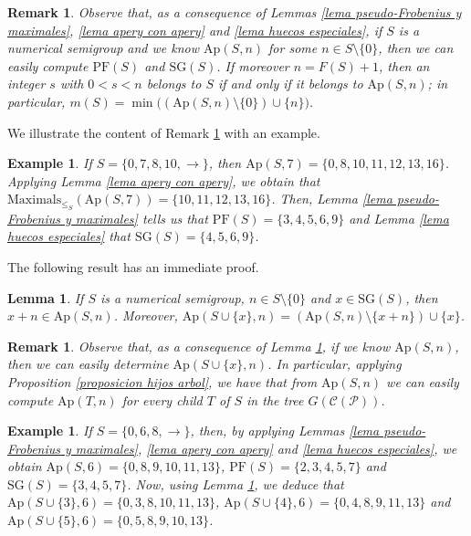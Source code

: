 \documentclass[11pt]{article}
\newtheorem{lemma}[theorem]{Lemma}
\newtheorem{remark}[theorem]{Remark}
\newtheorem{example}[theorem]{Example}
\numberwithin{equation}{section}
\newcommand{\Ap}{\mathrm{Ap}}
\begin{document}
\begin{remark}\label{nota primera}
    Observe that, as a consequence of Lemmas \ref{lema pseudo-Frobenius y maximales}, \ref{lema apery con apery} and \ref{lema huecos especiales}, if $S$ is a numerical semigroup and we know $\Ap(S,n)$ for some $n\in S\setminus\{0\}$, then we can easily compute $\mathrm{PF}(S)$ and $\mathrm{SG}(S)$. If moreover $n=F(S)+1$, then an integer $s$ with $0<s<n$ belongs to $S$ if and only if it belongs to $\Ap(S,n)$; in particular, $m(S)=\min\big((\Ap(S,n)\setminus\{0\})\cup\{n\}\big)$.
\end{remark}

We illustrate the content of Remark \ref{nota primera} with an example.

\begin{example}
    If $S=\{0,7,8,10,\rightarrow\}$, then $\mathrm{Ap}(S,7)=\{0,8,10,11,12,13,16\}$. Applying Lemma \ref{lema apery con apery}, we obtain that $\mathrm{Maximals}_{\leq_S}(\mathrm{Ap}(S,7))=\{10,11,12,13,16\}$. Then, Lemma \ref{lema pseudo-Frobenius y maximales} tells us that $\mathrm{PF}(S)=\{3,4,5,6,9\}$ and Lemma \ref{lema huecos especiales} that $\mathrm{SG}(S)=\{4,5,6,9\}$.
\end{example}

The following result has an immediate proof.

\begin{lemma}\label{lema apery y huecos especiales}
    If $S$ is a numerical semigroup, $n\in S\setminus\{0\}$ and $x\in\mathrm{SG}(S)$, then $x+n\in\mathrm{Ap}(S,n)$. Moreover, $\mathrm{Ap}(S\cup\{x\},n)=(\mathrm{Ap}(S,n)\setminus\{x+n\})\cup\{x\}$.
\end{lemma}

\begin{remark}\label{nota segunda}
    Observe that, as a consequence of Lemma \ref{lema apery y huecos especiales}, if we know $\mathrm{Ap}(S,n)$, then we can easily determine $\mathrm{Ap}(S\cup\{x\},n)$. In particular, applying Proposition \ref{proposicion hijos arbol}, we have that from $\mathrm{Ap}(S,n)$ we can easily compute $\mathrm{Ap}(T,n)$ for every child $T$ of $S$ in the tree $G(\mathcal C(\mathcal P))$.
\end{remark}

\begin{example}
   If $S=\{0,6,8,\rightarrow\}$, then, by applying Lemmas \ref{lema pseudo-Frobenius y maximales}, \ref{lema apery con apery} and \ref{lema huecos especiales}, we obtain $\mathrm{Ap}(S,6)=\{0,8,9,10,11,13\}$, $\mathrm{PF}(S)=\{2,3,4,5,7\}$ and $\mathrm{SG}(S)=\{3,4,5,7\}$. Now, using Lemma \ref{lema apery y huecos especiales}, we deduce that
$\mathrm{Ap}(S\cup\{3\},6)=\{0,3,8,10,11,13\}$, $\mathrm{Ap}(S\cup\{4\},6)=\{0,4,8,9,11,13\}$ and $\mathrm{Ap}(S\cup\{5\},6)=\{0,5,8,9,10,13\}$.
\end{example}
\end{document}
